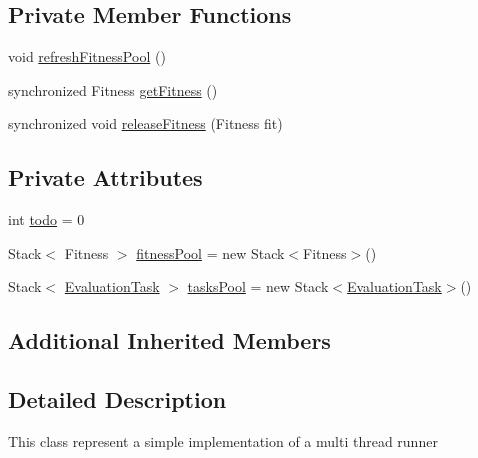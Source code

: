 \subsection*{Private Member Functions}
\begin{DoxyCompactItemize}
\item 
void \hyperlink{classjenes_1_1utils_1_1multitasking_1_1_multi_thread_evaluator_a90ae547a26d2566f5000856c053450af}{refresh\-Fitness\-Pool} ()
\item 
synchronized Fitness \hyperlink{classjenes_1_1utils_1_1multitasking_1_1_multi_thread_evaluator_a52406c9c6f2169319c48bba068bd102a}{get\-Fitness} ()
\item 
synchronized void \hyperlink{classjenes_1_1utils_1_1multitasking_1_1_multi_thread_evaluator_a8d7fbd44425e92968dbf904454b7ccbc}{release\-Fitness} (Fitness fit)
\end{DoxyCompactItemize}
\subsection*{Private Attributes}
\begin{DoxyCompactItemize}
\item 
int \hyperlink{classjenes_1_1utils_1_1multitasking_1_1_multi_thread_evaluator_aa6a82db6c77826d99c361ce5959ae441}{todo} = 0
\item 
Stack$<$ Fitness $>$ \hyperlink{classjenes_1_1utils_1_1multitasking_1_1_multi_thread_evaluator_aa8b1d2ff749ebd5fd37f9a7f5b419260}{fitness\-Pool} = new Stack$<$Fitness$>$()
\item 
Stack$<$ \hyperlink{classjenes_1_1utils_1_1multitasking_1_1_multi_thread_evaluator_1_1_evaluation_task}{Evaluation\-Task} $>$ \hyperlink{classjenes_1_1utils_1_1multitasking_1_1_multi_thread_evaluator_a672829f7b70815c7bb1c9379ab403312}{tasks\-Pool} = new Stack$<$\hyperlink{classjenes_1_1utils_1_1multitasking_1_1_multi_thread_evaluator_1_1_evaluation_task}{Evaluation\-Task}$>$()
\end{DoxyCompactItemize}
\subsection*{Additional Inherited Members}


\subsection{Detailed Description}
This class represent a simple implementation of a multi thread runner

